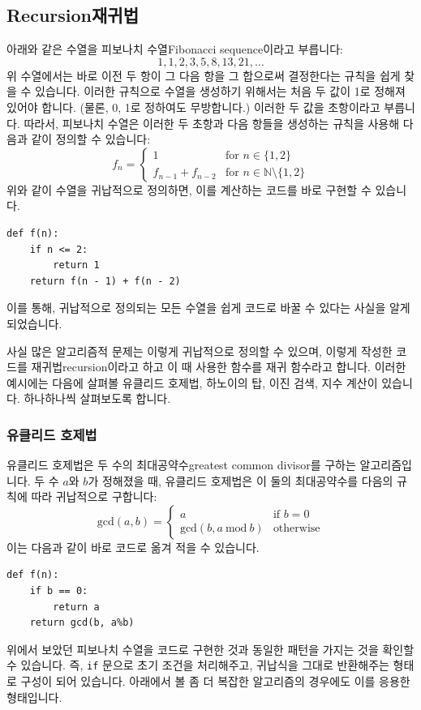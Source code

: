 \documentclass[../main.tex]{subfiles}
\begin{document}
\subsection{Recursion재귀법}
아래와 같은 수열을 피보나치 수열Fibonacci sequence이라고 부릅니다:
\[
1, 1, 2, 3, 5, 8, 13, 21, \dots
\]
위 수열에서는 바로 이전 두 항이 그 다음 항을 그 합으로써 결정한다는 규칙을 쉽게 찾을 수 있습니다.
이러한 규칙으로 수열을 생성하기 위해서는 처음 두 값이 1로 정해져 있어야 합니다.
(물론, 0, 1로 정하여도 무방합니다.)
이러한 두 값을 초항이라고 부릅니다.
따라서, 피보나치 수열은 이러한 두 초항과 다음 항들을 생성하는 규칙을 사용해 다음과 같이 정의할 수 있습니다:
\[
f_n = \begin{cases}
1 & \text{for $n \in \{1, 2\}$}\\
f_{n - 1} + f_{n - 2} & \text{for $n \in \mathbb{N} \setminus \{1, 2\}$}
\end{cases}
\]
위와 같이 수열을 귀납적으로 정의하면, 이를 계산하는 코드를 바로 구현할 수 있습니다.
\begin{verbatim}
def f(n):
	if n <= 2:
		return 1
	return f(n - 1) + f(n - 2)
\end{verbatim}
이를 통해, 귀납적으로 정의되는 모든 수열을 쉽게 코드로 바꿀 수 있다는 사실을 알게 되었습니다.

사실 많은 알고리즘적 문제는 이렇게 귀납적으로 정의할 수 있으며, 이렇게 작성한 코드를 재귀법recursion이라고 하고 이 때 사용한 함수를 재귀 함수라고 합니다.
이러한 예시에는 다음에 살펴볼 유클리드 호제법, 하노이의 탑, 이진 검색, 지수 계산이 있습니다.
하나하나씩 살펴보도록 합니다.

\subsubsection{유클리드 호제법}
유클리드 호제법은 두 수의 최대공약수greatest common divisor를 구하는 알고리즘입니다.
두 수 $a$와 $b$가 정해졌을 때, 유클리드 호제법은 이 둘의 최대공약수를 다음의 규칙에 따라 귀납적으로 구합니다:
\[
\mathrm{gcd}(a, b) = \begin{cases}
a & \text{if }b = 0\\
\mathrm{gcd}(b, a\ \mathrm{mod}\ b) & \text{otherwise}
\end{cases}
\]
이는 다음과 같이 바로 코드로 옮겨 적을 수 있습니다.
\begin{verbatim}
def f(n):
	if b == 0:
		return a
	return gcd(b, a%b)
\end{verbatim}
위에서 보았던 피보나치 수열을 코드로 구현한 것과 동일한 패턴을 가지는 것을 확인할 수 있습니다.
즉, \texttt{if} 문으로 초기 조건을 처리해주고, 귀납식을 그대로 반환해주는 형태로 구성이 되어 있습니다.
아래에서 볼 좀 더 복잡한 알고리즘의 경우에도 이를 응용한 형태입니다.
\end{document}
